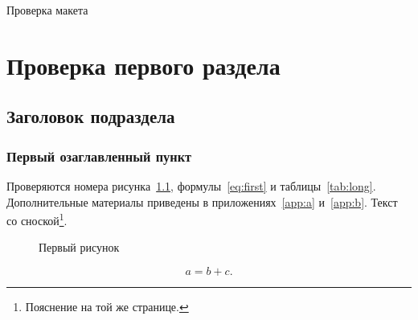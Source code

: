 \documentclass[14pt,a4paper,oneside]{extreport}
\begin{document}
\begin{GostTitlePage}\begin{center}Проверка макета\end{center}\end{GostTitlePage}
\GostTOC
\chapter{Проверка первого раздела}
\section{Заголовок подраздела}
\subsection{Первый озаглавленный пункт}
Проверяются номера рисунка~\ref{fig:first}, формулы~\eqref{eq:first} и таблицы~\ref{tab:long}.
Дополнительные материалы приведены в приложениях~\ref{app:a} и~\ref{app:b}.
Текст со сноской\footnote{Пояснение на той же странице.}.
\begin{figure}[!htbp]\centering{}
\caption{Первый рисунок}\label{fig:first}\end{figure}
\begin{equation}\label{eq:first}a=b+c.\end{equation}
\end{document}

